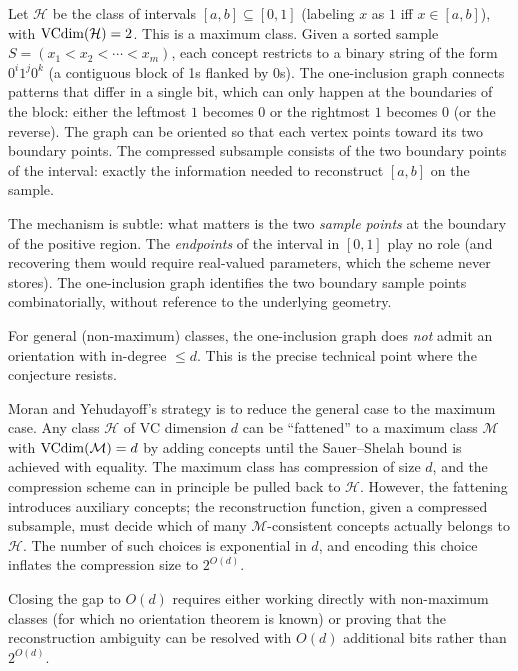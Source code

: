 \begin{example}
\label{ex:oig-intervals}
Let $\mathcal{H}$ be the class of intervals $[a, b] \subseteq [0, 1]$
(labeling $x$ as $1$ iff $x \in [a,b]$), with $\mathrm{VCdim}(\mathcal{H}) = 2$.
This is a maximum class.  Given a sorted sample
$S = (x_1 < x_2 < \cdots < x_m)$, each concept restricts to a binary
string of the form $0^i 1^j 0^k$ (a contiguous block of 1s flanked by
0s).  The one-inclusion graph connects patterns that differ in a single
bit, which can only happen at the boundaries of the block: either the
leftmost $1$ becomes $0$ or the rightmost $1$ becomes $0$ (or the
reverse).  The graph can be oriented so that each vertex points toward
its two boundary points.  The compressed subsample consists of the two
boundary points of the interval: exactly the information needed to
reconstruct $[a, b]$ on the sample.

The mechanism is subtle: what matters is the two \emph{sample points}
at the boundary of the positive region.  The \emph{endpoints} of the
interval in $[0,1]$ play no role (and recovering them would require
real-valued parameters, which the scheme never stores).  The
one-inclusion graph identifies the two boundary sample points
combinatorially, without reference to the underlying geometry.
\end{example}

For general (non-maximum) classes, the one-inclusion graph does
\emph{not} admit an orientation with in-degree $\leq d$.  This is
the precise technical point where the conjecture resists.

\begin{remark}
\label{rmk:max-general-gap}
Moran and Yehudayoff's strategy is to reduce the general case to the
maximum case.  Any class $\mathcal{H}$ of VC dimension $d$ can be
``fattened'' to a maximum class $\mathcal{M}$ with
$\mathrm{VCdim}(\mathcal{M}) = d$ by adding concepts until the Sauer--Shelah
bound is achieved with equality.  The maximum class has compression of
size $d$, and the compression scheme can in principle be pulled back to
$\mathcal{H}$.  However, the fattening introduces auxiliary
concepts; the reconstruction function, given a compressed subsample,
must decide which of many $\mathcal{M}$-consistent concepts actually
belongs to $\mathcal{H}$.  The number of such choices is exponential
in $d$, and encoding this choice inflates the compression size to
$2^{O(d)}$.

Closing the gap to $O(d)$ requires either working directly with
non-maximum classes (for which no orientation theorem is known) or
proving that the reconstruction ambiguity can be resolved with
$O(d)$ additional bits rather than $2^{O(d)}$.
\end{remark}


